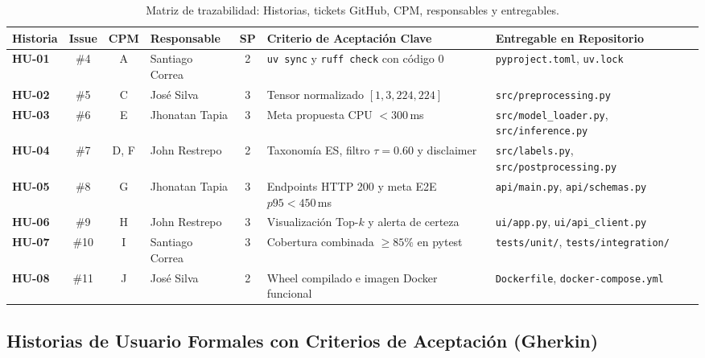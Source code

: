 \documentclass[12pt,letterpaper]{article}
\begin{document}
\begin{table}[!htbp]
\centering
\caption{Matriz de trazabilidad: Historias, tickets GitHub, CPM, responsables y entregables.}
\label{tab:trazabilidad}
\footnotesize
\setlength{\tabcolsep}{3.0pt}
\begin{tabularx}{\textwidth}{l c c l c X >{\raggedright\arraybackslash}p{3.2cm}}
\toprule
\textbf{Historia} & \textbf{Issue} & \textbf{CPM} & \textbf{Responsable} & \textbf{SP} & \textbf{Criterio de Aceptación Clave} & \textbf{Entregable en Repositorio} \\
\midrule
\textbf{HU-01} & \#4 & A & Santiago Correa & 2 & \texttt{uv sync} y \texttt{ruff check} con código 0 & \texttt{pyproject.toml}, \texttt{uv.lock} \\
\textbf{HU-02} & \#5 & C & José Silva & 3 & Tensor normalizado $[1, 3, 224, 224]$ & \texttt{src/\allowbreak preprocessing.py} \\
\textbf{HU-03} & \#6 & E & Jhonatan Tapia & 3 & Meta propuesta CPU \mbox{$< 300$\,ms} & \texttt{src/\allowbreak model\_loader.py}, \texttt{src/inference.py} \\
\textbf{HU-04} & \#7 & D, F & John Restrepo & 2 & Taxonomía ES, filtro $\tau = 0.60$ y disclaimer & \texttt{src/labels.py}, \texttt{src/}\allowbreak\texttt{postprocessing.py} \\
\textbf{HU-05} & \#8 & G & Jhonatan Tapia & 3 & Endpoints HTTP 200 y meta E2E \mbox{$p95 < 450$\,ms} & \texttt{api/main.py}, \texttt{api/schemas.py} \\
\textbf{HU-06} & \#9 & H & John Restrepo & 3 & Visualización Top-$k$ y alerta de certeza & \texttt{ui/app.py}, \texttt{ui/api\_client.py} \\
\textbf{HU-07} & \#10 & I & Santiago Correa & 3 & Cobertura combinada $\ge 85\%$ en pytest & \texttt{tests/unit/}, \allowbreak \texttt{tests/}\allowbreak\texttt{integration/} \\
\textbf{HU-08} & \#11 & J & José Silva & 2 & Wheel compilado e imagen Docker funcional & \texttt{Dockerfile}, \texttt{docker-\allowbreak compose.yml} \\
\bottomrule
\end{tabularx}
\end{table}

\subsection{Historias de Usuario Formales con Criterios de Aceptación (Gherkin)}
\end{document}
